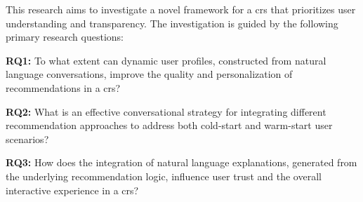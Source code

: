 This research aims to investigate a novel framework for a \ac{crs} that prioritizes user understanding and transparency. The investigation is guided by the following primary research questions:

\begin{compactenum}
    \item[\textbf{RQ1:}] To what extent can dynamic user profiles, constructed from natural language conversations, improve the quality and personalization of recommendations in a \ac{crs}?
    \item[\textbf{RQ2:}] What is an effective conversational strategy for integrating different recommendation approaches to address both cold-start and warm-start user scenarios?
    \item[\textbf{RQ3:}] How does the integration of natural language explanations, generated from the underlying recommendation logic, influence user trust and the overall interactive experience in a \ac{crs}?
\end{compactenum}